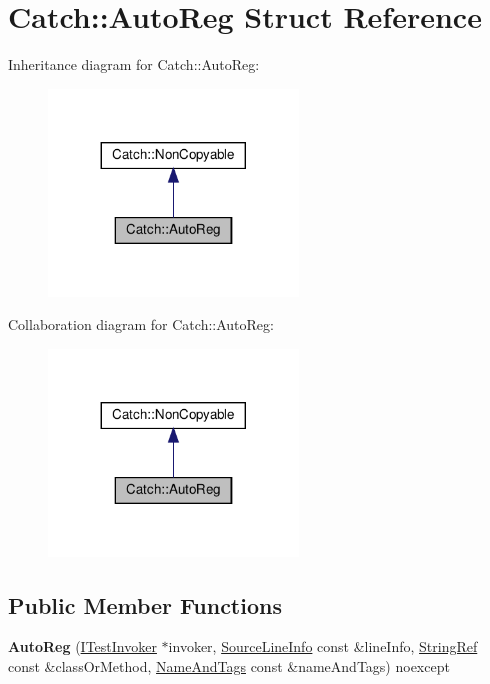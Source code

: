 \hypertarget{structCatch_1_1AutoReg}{}\section{Catch\+::Auto\+Reg Struct Reference}
\label{structCatch_1_1AutoReg}


Inheritance diagram for Catch\+::Auto\+Reg\+:
\nopagebreak
\begin{figure}[H]
\begin{center}
\leavevmode
\includegraphics[width=188pt]{structCatch_1_1AutoReg__inherit__graph}
\end{center}
\end{figure}


Collaboration diagram for Catch\+::Auto\+Reg\+:
\nopagebreak
\begin{figure}[H]
\begin{center}
\leavevmode
\includegraphics[width=188pt]{structCatch_1_1AutoReg__coll__graph}
\end{center}
\end{figure}
\subsection*{Public Member Functions}
\begin{DoxyCompactItemize}
\item 
\mbox{\label{structCatch_1_1AutoReg_a7eba02fb9d80b9896bf5a6517369af28}} 
{\bfseries Auto\+Reg} (\mbox{\hyperlink{structCatch_1_1ITestInvoker}{I\+Test\+Invoker}} $\ast$invoker, \mbox{\hyperlink{structCatch_1_1SourceLineInfo}{Source\+Line\+Info}} const \&line\+Info, \mbox{\hyperlink{classCatch_1_1StringRef}{String\+Ref}} const \&class\+Or\+Method, \mbox{\hyperlink{structCatch_1_1NameAndTags}{Name\+And\+Tags}} const \&name\+And\+Tags) noexcept
\end{DoxyCompactItemize}


